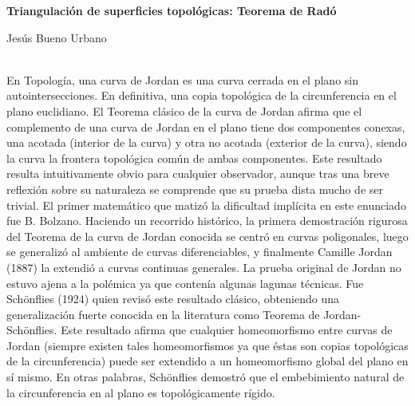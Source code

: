 %



\cleardoublepage
\thispagestyle{empty}

\begin{center}
{\large\bfseries Triangulación de superficies topológicas: Teorema de Radó}\\
\end{center}
\begin{center}
Jesús Bueno Urbano\\
\end{center}


\vspace{0.7cm}
\\

En Topología, una curva de Jordan es una curva cerrada en el plano sin autointersecciones. En definitiva, una copia topológica de la circunferencia en el plano euclidiano. El Teorema clásico de la curva de Jordan  afirma que el complemento de una curva de Jordan en el plano tiene dos componentes conexas, una acotada (interior de la curva) y otra no acotada   (exterior de la curva), siendo la curva la frontera topológica común  de ambas componentes. Este resultado resulta intuitivamente obvio para cualquier observador, aunque tras una breve reflexión sobre su naturaleza se comprende  que su prueba dista mucho de ser trivial. El primer matemático que matizó la dificultad implícita en este enunciado fue B. Bolzano. Haciendo un recorrido histórico, la primera demostración rigurosa del Teorema de la curva de Jordan conocida se centró en curvas poligonales, luego se generalizó al ambiente de curvas diferenciables, y finalmente   Camille Jordan (1887) la extendió a curvas continuas generales. La prueba original de Jordan no estuvo ajena a la polémica ya que contenía algunas lagunas técnicas. Fue Schönflies (1924) quien  revisó este resultado clásico,  obteniendo una generalización fuerte conocida en la literatura como Teorema de Jordan-Schönflies. Este resultado afirma que cualquier homeomorfismo entre   curvas de Jordan (siempre existen tales homeomorfismos ya que   éstas son copias topológicas de la circunferencia) puede ser extendido a un homeomorfismo global del plano en sí mismo. En otras palabras, Schönflies demostró que el embebimiento natural de la circunferencia en al plano es topológicamente rígido. 

